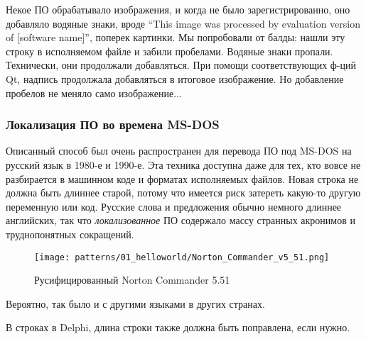 Некое ПО обрабатывало изображения, и когда не было зарегистрированно, оно добавляло водяные знаки,
вроде ``This image was processed by evaluation version of [software name]'', поперек картинки.
Мы попробовали от балды: нашли эту строку в исполняемом файле и забили пробелами.
Водяные знаки пропали.
Технически, они продолжали добавляться.
При помощи соответствующих ф-ций Qt, надпись продолжала добавляться в итоговое изображение.
Но добавление пробелов не меняло само изображение...

\subsubsection{Локализация ПО во времена MS-DOS}

Описанный способ был очень распространен для перевода ПО под MS-DOS на русский язык в 1980-е и 1990-е.
Эта техника доступна даже для тех, кто вовсе не разбирается в машинном коде и форматах исполняемых
файлов.
Новая строка не должна быть длиннее старой, потому что имеется риск затереть какую-то другую переменную
или код.
Русские слова и предложения обычно немного длиннее английских, так что \emph{локализованное} ПО содержало
массу странных акронимов и труднопонятных сокращений.

\begin{figure}[H]
\centering
\texttt{[image: patterns/01\_helloworld/Norton\_Commander\_v5\_51.png]}
\caption{Русифицированный Norton Commander 5.51}
\end{figure}

Вероятно, так было и с другими языками в других странах.

В строках в Delphi, длина строки также должна быть поправлена, если нужно.
